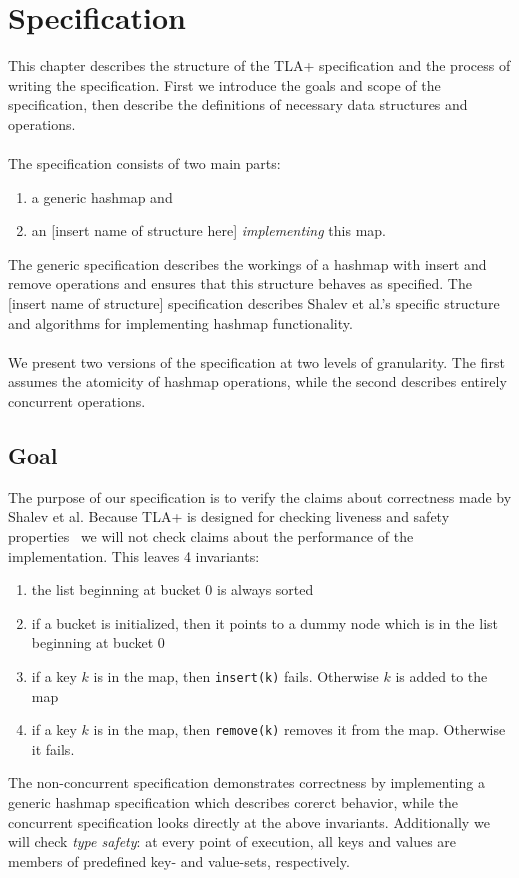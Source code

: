 \documentclass{uit-thesis}
\begin{document}
\chapter{Specification}\label{ch:specification}
This chapter describes the structure of the TLA+ specification and the process of writing the specification. First we introduce the goals and scope of the specification, then describe the definitions of necessary data structures and operations.
\\\\
The specification consists of two main parts:
\begin{enumerate}
    \item a generic hashmap and
    \item an [insert name of structure here] \textit{implementing} this map.
\end{enumerate}
The generic specification describes the workings of a hashmap with insert and remove operations and ensures that this structure behaves as specified. The [insert name of structure] specification describes Shalev et al.'s specific structure and algorithms for implementing hashmap functionality.
\\\\
We present two versions of the specification at two levels of granularity. The first assumes the atomicity of hashmap operations, while the second describes entirely concurrent operations.

\section{Goal}\label{sec:spec-goals}
The purpose of our specification is to verify the claims about correctness made by Shalev et al. Because TLA+ is designed for checking liveness and safety properties~\cite{Lund2019} we will not check claims about the performance of the implementation. This leaves 4 invariants:
\begin{enumerate}
    \item the list beginning at bucket 0 is always sorted
    \item if a bucket is initialized, then it points to a dummy node which is in the list beginning at bucket 0
    \item if a key $k$ is in the map, then \texttt{insert(k)} fails. Otherwise $k$ is added to the map
    \item if a key $k$ is in the map, then \texttt{remove(k)} removes it from the map. Otherwise it fails.
\end{enumerate}
The non-concurrent specification demonstrates correctness by implementing a generic hashmap specification which describes corerct behavior, while the concurrent specification looks directly at the above invariants.
Additionally we will check \textit{type safety}: at every point of execution, all keys and values are members of predefined key- and value-sets, respectively.
\end{document}
